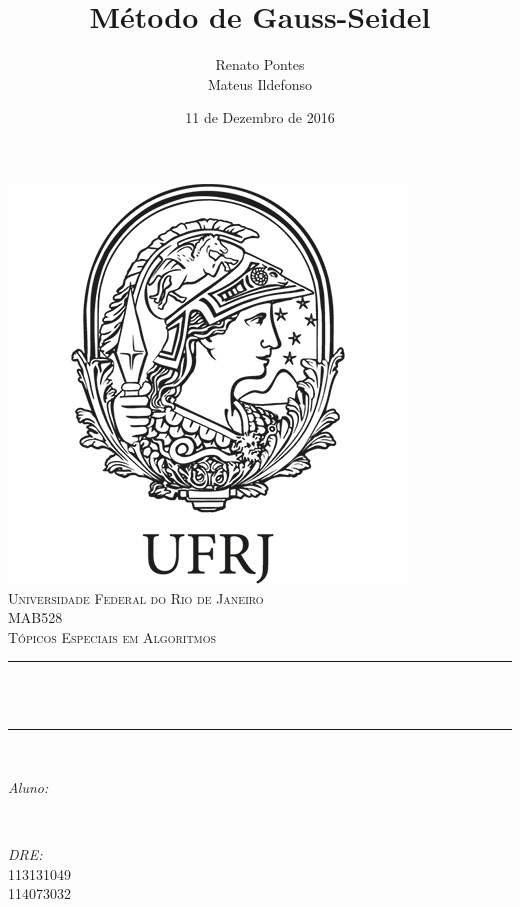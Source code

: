 \documentclass[a4paper,landscape,11pt]{article}
\title{Método de Gauss-Seidel}			                    		%
\author{Renato Pontes\\Mateus Ildefonso}	%
\date{11 de Dezembro de 2016}										%
\makeatletter
\let\thetitle\@title
\let\theauthor\@author
\let\thedate\@date
\makeatother
\begin{document}
\lstset{basicstyle=\footnotesize\ttfamily,breaklines=true, tabsize=4}

\begin{titlepage}
	\centering
    \vspace*{0.5 cm}
    \includegraphics[scale = 0.50]{minerva.jpg}\\[1.0 cm]	%
    \textsc{\LARGE Universidade Federal do Rio de Janeiro}\\[2.0 cm]
	\textsc{\Large MAB528}\\[0.5 cm]				    %
	\textsc{\large Tópicos Especiais em Algoritmos}\\[0.5 cm]	%
	\rule{\linewidth}{0.2 mm} \\[0.4 cm]
	{ \huge \bfseries \thetitle}\\
	\rule{\linewidth}{0.2 mm} \\[1.5 cm]
	
	\begin{minipage}{0.4\textwidth}
		\begin{flushleft} \large
			\emph{Aluno:}\\
			\theauthor
			\end{flushleft}
			\end{minipage}~
			\begin{minipage}{0.4\textwidth}
			\begin{flushright} \large
			\emph{DRE:} \\
			113131049\\114073032					%
		\end{flushright}
	\end{minipage}\\[2 cm]
	
	{\large \thedate}\\[2 cm]
 
	\vfill
	
\end{titlepage}
\end{document}
